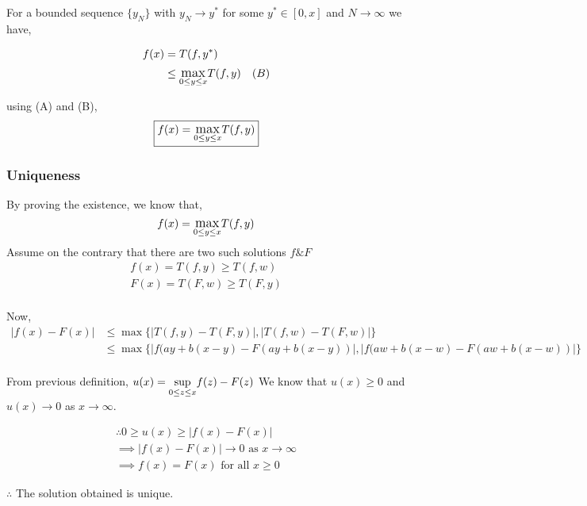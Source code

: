For a bounded sequence $\{y_N\}$ with $y_N \rightarrow y^*$ for some $y^* \in [0, x]$ and $N \rightarrow \infty$ we have,

\begin{align*}
    f(x) &= T(f, y^*) \\
        &\le \mathlarger{\max}_{0 \le y \le x} T(f, y) & (B)\\
\end{align*}

using (A) and (B), 
$$
\boxed{f(x) = \mathlarger{\max}_{0 \le y \le x} T(f, y)}
$$

\subsubsection*{Uniqueness}
By proving the existence, we know that,
$$f(x) = \mathlarger{\max}_{0 \le y \le x} T(f, y)$$
Assume on the contrary that there are two such solutions $f \& F$
\begin{align*}
    f(x) = T(f, y) \ge T(f, w)\\
    F(x) = T(F, w) \ge T(F, y)\\
\end{align*}

Now,
\begin{align*}
    |f(x) - F(x)| &\le \max\{|T(f, y) - T(F, y)|,|T(f, w) - T(F, w)|\}\\
                    &\le \max\{|f(ay+b(x-y) - F(ay+b(x-y))|,|f(aw+b(x-w) - F(aw+b(x-w))|\}\\
\end{align*}

From previous definition, $u(x) = \mathlarger{\sup}_{0 \le z \le x} f(z) - F(z)$
We know that $u(x) \ge 0$ and $u(x) \rightarrow 0$ as $x \rightarrow \infty$.

\begin{align*}
    \therefore 0 \ge u(x) \ge |f(x) - F(x)| \\
    \implies |f(x) - F(x)| \rightarrow 0 \text{ as } x \rightarrow \infty\\
    \implies f(x) = F(x) \text{ for all } x \ge 0
\end{align*}

$\therefore$ The solution obtained is unique.

